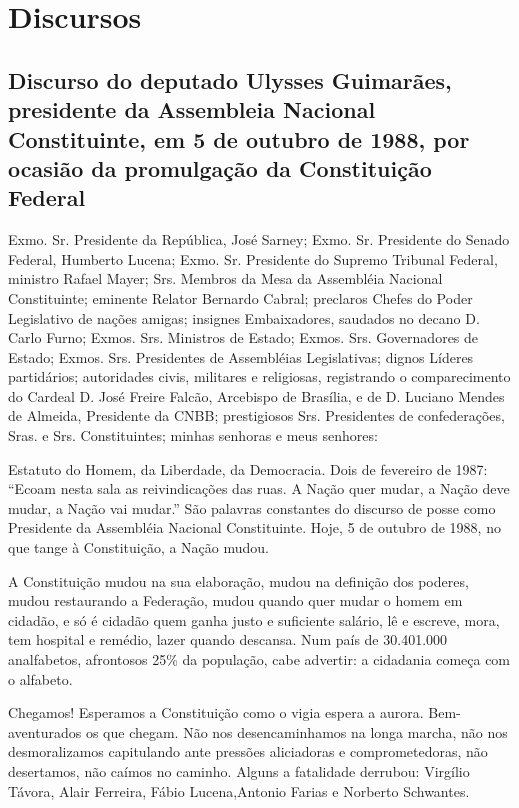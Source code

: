 \part{Discursos}

\chapter{Discurso do deputado Ulysses Guimarães, presidente da Assembleia
Nacional Constituinte, em 5 de outubro de 1988, por ocasião da
promulgação da Constituição Federal}


Exmo. Sr. Presidente da República, José Sarney; Exmo. Sr. Presidente
do Senado Federal, Humberto Lucena; Exmo. Sr. Presidente do Supremo
Tribunal Federal, ministro Rafael Mayer; Srs. Membros da Mesa da
Assembléia Nacional Constituinte; eminente Relator Bernardo Cabral;
preclaros Chefes do Poder Legislativo de nações amigas; insignes
Embaixadores, saudados no decano D. Carlo Furno; Exmos. Srs. Ministros
de Estado; Exmos. Srs. Governadores de Estado; Exmos. Srs. Presidentes
de Assembléias Legislativas; dignos Líderes partidários; autoridades
civis, militares e religiosas, registrando o comparecimento do Cardeal
D. José Freire Falcão, Arcebispo de Brasília, e de D. Luciano Mendes de
Almeida, Presidente da CNBB; prestigiosos Srs. Presidentes de
confederações, Sras. e Srs. Constituintes; minhas senhoras e meus
senhores:

Estatuto do Homem, da Liberdade, da Democracia. Dois de fevereiro de
1987: ``Ecoam nesta sala as reivindicações das ruas. A Nação quer mudar,
a Nação deve mudar, a Nação vai mudar.'' São palavras constantes do
discurso de posse como Presidente da Assembléia Nacional Constituinte.
Hoje, 5 de outubro de 1988, no que tange à Constituição, a Nação mudou.

A Constituição mudou na sua elaboração, mudou na definição dos poderes,
mudou restaurando a Federação, mudou quando quer mudar o homem em
cidadão, e só é cidadão quem ganha justo e suficiente salário, lê e
escreve, mora, tem hospital e remédio, lazer quando descansa. Num país
de 30.401.000 analfabetos, afrontosos 25\% da população, cabe advertir:
a cidadania começa com o alfabeto.

Chegamos! Esperamos a Constituição como o vigia espera a aurora.
Bem-aventurados os que chegam. Não nos desencaminhamos na longa marcha,
não nos desmoralizamos capitulando ante pressões aliciadoras e
comprometedoras, não desertamos, não caímos no caminho. Alguns a
fatalidade derrubou: Virgílio Távora, Alair Ferreira, Fábio
Lucena,Antonio Farias e Norberto Schwantes.

